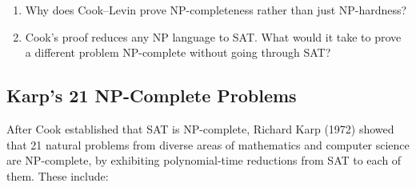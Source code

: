 \begin{checkyou}
\begin{enumerate}
  \item Why does Cook--Levin prove NP-completeness rather than just NP-hardness?
  \item Cook's proof reduces any NP language to SAT. What would it take to prove a different problem NP-complete without going through SAT?
\end{enumerate}
\end{checkyou}

\subsection{Karp's 21 NP-Complete Problems}

After Cook established that SAT is NP-complete, Richard Karp (1972) showed that 21 natural problems from diverse areas of mathematics and computer science are NP-complete, by exhibiting polynomial-time reductions from SAT to each of them. These include:

